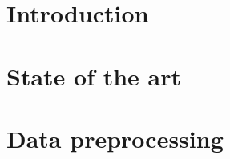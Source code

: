 \documentclass[11pt, a4paper]{article}
\begin{document}






\newpage

\section{Introduction}



\section{State of the art}



\section{Data preprocessing}



\newpage

\printbibliography%
\end{document}
